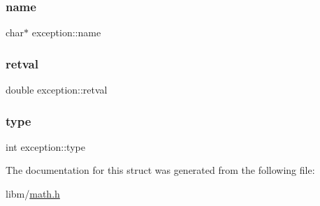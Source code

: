 \subsubsection{\texorpdfstring{name}{name}}
{\footnotesize\ttfamily char$\ast$ exception\+::name}

\mbox{\label{structexception_a3b9cb600557fbf2b86e7ea18861dc1bb}} 
\subsubsection{\texorpdfstring{retval}{retval}}
{\footnotesize\ttfamily double exception\+::retval}

\mbox{\label{structexception_a87f4034c8d562b108c9f6a30c7c54733}} 
\subsubsection{\texorpdfstring{type}{type}}
{\footnotesize\ttfamily int exception\+::type}



The documentation for this struct was generated from the following file\+:\begin{DoxyCompactItemize}
\item 
libm/\hyperlink{math_8h}{math.\+h}\end{DoxyCompactItemize}
